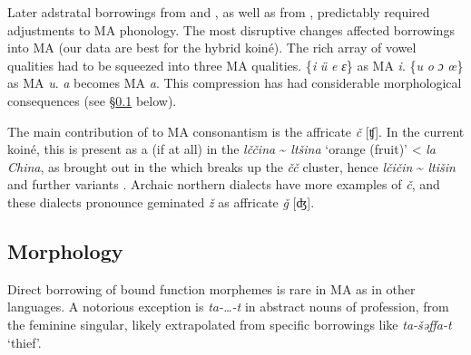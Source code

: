 \documentclass[output=paper]{langsci/langscibook}
\begin{document}
Later adstratal borrowings from  and , as well as from , predictably required adjustments to MA phonology. The most disruptive changes affected  borrowings into MA (our data are best for the hybrid koiné). The rich array of  vowel qualities had to be squeezed into three MA qualities.  \{\textit{i} \textit{ü} \textit{e} \textit{ɛ}\}  as MA \textit{i}.  \{\textit{u} \textit{o} \textit{ɔ} \textit{œ}\}  as MA \textit{u}.  \textit{a} becomes MA \textit{a}. This compression has had considerable morphological consequences (see §\ref{morphol} below).

The main contribution of  to MA consonantism is the affricate \textit{č} [ʧ]. In the current koiné, this is present as a  (if at all) in the  \textit{lččina} {\textasciitilde} \textit{ltšina} ‘orange (fruit)’ <  \textit{la} \textit{China}, as brought out in the  which breaks up the \textit{čč} cluster, hence \textit{lčičin} {\textasciitilde} \textit{ltišin} and further variants \citep{Heath1999}. Archaic northern dialects have more examples of \textit{č}, and these dialects pronounce geminated \textit{ž} as affricate \textit{ǧ} [ʤ].

\subsection{Morphology} \label{morphol}

Direct borrowing of bound function morphemes is rare in MA as in other languages. A notorious exception is \textit{ta-…-t} in abstract nouns of profession, from the  feminine singular, likely extrapolated from specific  borrowings like \textit{ta-šəffa{\R}-t} ‘thief’. 
\end{document}
